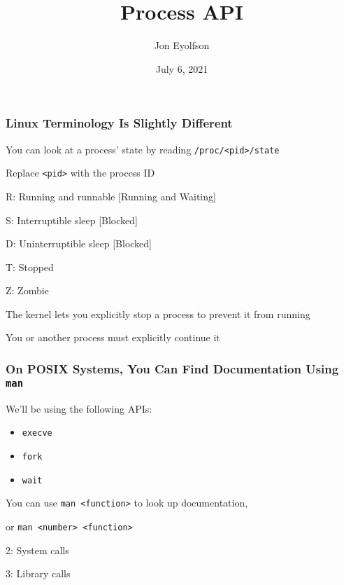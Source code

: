 

\title{Process API}
\author{Jon Eyolfson}
\date{July 6, 2021}


  \begin{frame}
    \titlepage
  \end{frame}

  \begin{frame}
    \frametitle{Linux Terminology Is Slightly Different}

    You can look at a process' state by reading \texttt{/proc/<pid>/state}

    \hspace{2em} Replace \texttt{<pid>} with the process ID

    \vspace{2em}

    R: Running and runnable [Running and Waiting]

    S: Interruptible sleep [Blocked]

    D: Uninterruptible sleep [Blocked]

    T: Stopped

    Z: Zombie

    \vspace{2em}

    The kernel lets you explicitly stop a process to prevent it from running

    \hspace{2em} You or another process must explicitly continue it
  \end{frame}

  \begin{frame}
    \frametitle{On POSIX Systems, You Can Find Documentation Using \texttt{man}}

    We'll be using the following APIs:
    \begin{itemize}
      \item \texttt{execve}
      \item \texttt{fork}
      \item \texttt{wait}
    \end{itemize}

    \vspace{2em}

    You can use \texttt{man <function>} to look up documentation,

    or \texttt{man <number> <function>}

    \hspace{2em} 2: System calls

    \hspace{2em} 3: Library calls
  \end{frame}


